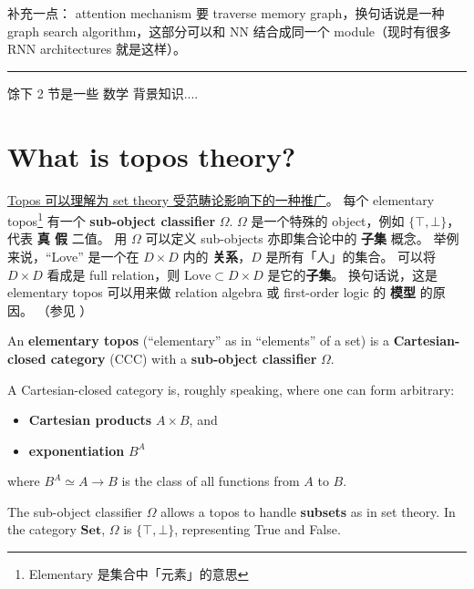 \documentclass[12pt, orivec]{article}
\newcommand{\cc}[2]{#1}
\newcommand{\cc}[2]{#2}
\begin{document}
\cc{补充一点： attention mechanism 要 traverse memory graph，换句话说是一种 graph search algorithm，这部分可以和 NN 结合成同一个 module（现时有很多 RNN architectures 就是这样）。
}{
Add a point: attention mechanism to traverse memory graph, in other words a graph search algorithm, this part can be combined with NN into the same module (there are many RNN architectures now).}

\begin{center}
\rule{0.4\textwidth}{.6pt}
\end{center}
\cc{馀下 2 节是一些 数学 背景知识....
}{
The rest of this paper are some background mathematical knowledge...}

\section{What is topos theory?}
\label{topos}

\cc{\uline{Topos 可以理解为 set theory 受范畴论影响下的一种推广}。 每个 elementary topos\footnote{Elementary 是集合中「元素」的意思} 有一个 \textbf{sub-object classifier} $\Omega$.  $\Omega$ 是一个特殊的 object，例如 $\{ \top, \bot \}$，代表 \textbf{真 假} 二值。 用 $\Omega$ 可以定义 sub-objects 亦即集合论中的 \textbf{子集} 概念。  举例来说，``Love'' 是一个在 $D \times D$ 内的 \textbf{关系}，$D$ 是所有「人」的集合。  可以将 $D \times D$ 看成是 full relation，则 $\mbox{Love} \subset D \times D$ 是它的\textbf{子集}。  换句话说，这是 elementary topos 可以用来做 relation algebra 或 first-order logic 的 \textbf{模型} 的原因。 （参见 \parencite{Goldblatt1984}）
}{
\uline{Topos theory can be understood as a generalization of set theory under the influence of category theory}.}

An \textbf{elementary topos} (``elementary'' as in ``elements'' of a set) is a \textbf{Cartesian-closed category} (CCC) with a \textbf{sub-object classifier} $\Omega$.

A Cartesian-closed category is, roughly speaking, where one can form arbitrary:
\begin{itemize}
\item  \textbf{Cartesian products} $A \times B$, and
\item  \textbf{exponentiation} $B^A$
\end{itemize}
where $B^A \simeq A \rightarrow B$ is the class of all functions from $A$ to $B$.

The sub-object classifier $\Omega$ allows a topos to handle \textbf{subsets} as in set theory.  In the category $\mathbf{Set}$, $\Omega$ is $\{ \top, \bot \}$, representing True and False.  
\end{document}
